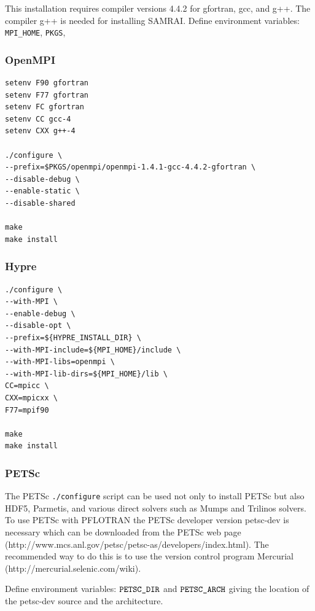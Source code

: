 \documentclass[12pt]{article}
\begin{document}
This installation requires compiler versions 4.4.2 for gfortran, gcc, and g++. The compiler g++ is needed for installing SAMRAI.
Define environment variables: {\tt MPI\_HOME}, {\tt PKGS}, 

\subsubsection{OpenMPI}

\begin{verbatim}
setenv F90 gfortran
setenv F77 gfortran
setenv FC gfortran
setenv CC gcc-4
setenv CXX g++-4

./configure \
--prefix=$PKGS/openmpi/openmpi-1.4.1-gcc-4.4.2-gfortran \
--disable-debug \
--enable-static \
--disable-shared

make
make install
\end{verbatim}

\subsubsection{Hypre}

\begin{verbatim}
./configure \
--with-MPI \
--enable-debug \
--disable-opt \
--prefix=${HYPRE_INSTALL_DIR} \
--with-MPI-include=${MPI_HOME}/include \
--with-MPI-libs=openmpi \
--with-MPI-lib-dirs=${MPI_HOME}/lib \
CC=mpicc \
CXX=mpicxx \
F77=mpif90

make
make install
\end{verbatim}

\subsubsection{PETSc}

The PETSc {\tt ./configure} script can be used not only to install PETSc but also HDF5, Parmetis, and various direct solvers such as Mumps and Trilinos solvers. To use PETSc with PFLOTRAN the PETSc developer version petsc-dev is necessary which can be downloaded from the PETSc web page (http://www.mcs.anl.gov/petsc/petsc-as/developers/index.html). The recommended way to do this is to use the version control program Mercurial \linebreak (http://mercurial.selenic.com/wiki).

Define environment variables: $\verb|PETSC_DIR|$ and $\verb|PETSC_ARCH|$ giving the location of the petsc-dev source and the architecture.
\end{document}
